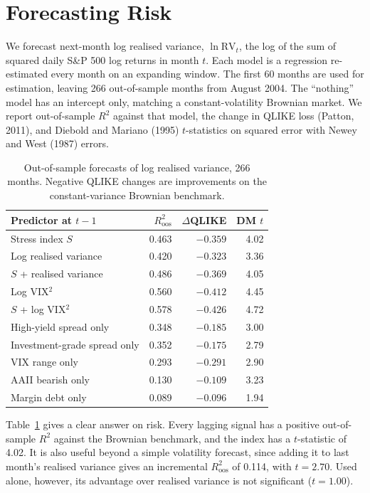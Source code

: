 \documentclass[10pt,twocolumn,letterpaper]{article}
\begin{document}
\section{Forecasting Risk}

We forecast next-month log realised variance, $\ln \mathrm{RV}_t$, the log of the sum of squared daily S\&P 500 log returns in month $t$. Each model is a regression re-estimated every month on an expanding window. The first 60 months are used for estimation, leaving 266 out-of-sample months from August 2004. The ``nothing'' model has an intercept only, matching a constant-volatility Brownian market. We report out-of-sample $R^2$ against that model, the change in QLIKE loss (Patton, 2011), and Diebold and Mariano (1995) $t$-statistics on squared error with Newey and West (1987) errors.

\begin{table}[h]
\centering
\caption{Out-of-sample forecasts of log realised variance, 266 months. Negative QLIKE changes are improvements on the constant-variance Brownian benchmark.}
\label{tab:risk}
\footnotesize
\setlength{\tabcolsep}{4pt}
\begin{tabular}{lrrr}
\toprule
Predictor at $t-1$ & $R^2_{\text{oos}}$ & $\Delta$QLIKE & DM $t$ \\
\midrule
Stress index $S$ & 0.463 & $-0.359$ & 4.02 \\
Log realised variance & 0.420 & $-0.323$ & 3.36 \\
$S$ + realised variance & 0.486 & $-0.369$ & 4.05 \\
Log VIX$^2$ & 0.560 & $-0.412$ & 4.45 \\
$S$ + log VIX$^2$ & 0.578 & $-0.426$ & 4.72 \\
\addlinespace[2pt]
High-yield spread only & 0.348 & $-0.185$ & 3.00 \\
Investment-grade spread only & 0.352 & $-0.175$ & 2.79 \\
VIX range only & 0.293 & $-0.291$ & 2.90 \\
AAII bearish only & 0.130 & $-0.109$ & 3.23 \\
Margin debt only & 0.089 & $-0.096$ & 1.94 \\
\bottomrule
\end{tabular}
\end{table}

Table~\ref{tab:risk} gives a clear answer on risk. Every lagging signal has a positive out-of-sample $R^2$ against the Brownian benchmark, and the index has a $t$-statistic of 4.02. It is also useful beyond a simple volatility forecast, since adding it to last month's realised variance gives an incremental $R^2_{\text{oos}}$ of 0.114, with $t = 2.70$. Used alone, however, its advantage over realised variance is not significant ($t = 1.00$).
\end{document}
